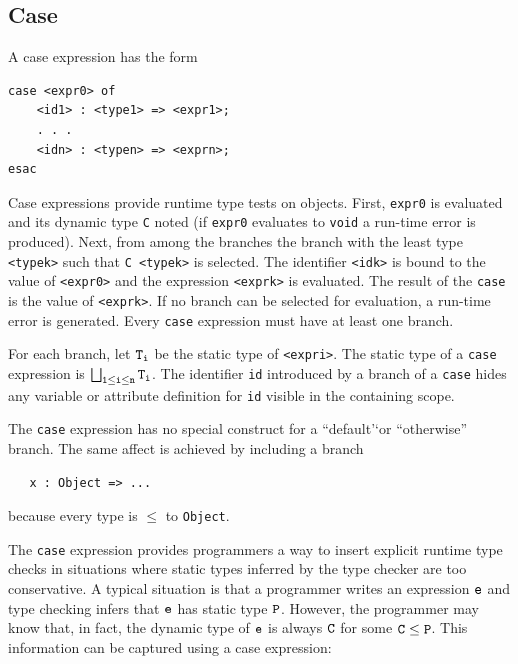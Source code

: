 \documentclass[]{article}
\begin{document}
\subsection{Case}

A case expression has the form

\begin{verbatim}
case <expr0> of 
    <id1> : <type1> => <expr1>; 
    . . .
    <idn> : <typen> => <exprn>; 
esac
\end{verbatim}

Case expressions provide runtime type tests on objects. First,
\texttt{expr0} is evaluated and its dynamic type \texttt{C} noted (if
\texttt{expr0} evaluates to \texttt{void} a run-time error is produced).
Next, from among the branches the branch with the least type
\texttt{\textless{}typek\textgreater{}} such that
\texttt{C  \textless{}typek\textgreater{}} is selected. The identifier
\texttt{\textless{}idk\textgreater{}} is bound to the value of
\texttt{\textless{}expr0\textgreater{}} and the expression
\texttt{\textless{}exprk\textgreater{}} is evaluated. The result of the
\texttt{case} is the value of \texttt{\textless{}exprk\textgreater{}}.
If no branch can be selected for evaluation, a run-time error is
generated. Every \texttt{case} expression must have at least one branch.

For each branch, let $\tt T_i$ be the static type of
\texttt{\textless{}expri\textgreater{}}. The static type of a
\texttt{case} expression is $\tt\bigsqcup_{1 \leq i \leq
n} T_i$. The identifier \texttt{id} introduced by a branch of a
\texttt{case} hides any variable or attribute definition for \texttt{id}
visible in the containing scope.

The \texttt{case} expression has no special construct for a
``default'`or ``otherwise'' branch. The same affect is achieved by
including a branch

\begin{verbatim}
   x : Object => ...
\end{verbatim}

because every type is $\leq$ to \texttt{Object}.

The \texttt{case} expression provides programmers a way to insert
explicit runtime type checks in situations where static types inferred
by the type checker are too conservative. A typical situation is that a
programmer writes an expression $\tt e$ and type checking infers that
$\tt e$ has static type $\tt P$. However, the programmer may know that,
in fact, the dynamic type of $\tt e$ is always $\tt C$ for some
$\tt C \leq P$. This information can be captured using a case
expression:
\end{document}
